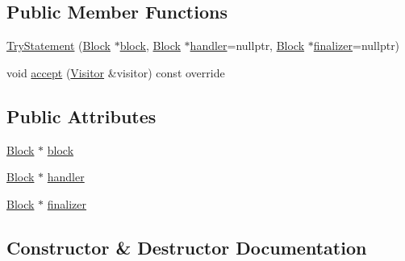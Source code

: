 \subsection*{Public Member Functions}
\begin{DoxyCompactItemize}
\item 
\hyperlink{structast_1_1_try_statement_a315c1d32293009b676f1780044118ed3}{Try\+Statement} (\hyperlink{structast_1_1_block}{Block} $\ast$\hyperlink{structast_1_1_try_statement_a9dccbeec8ca4f06ba27991614b8f64ba}{block}, \hyperlink{structast_1_1_block}{Block} $\ast$\hyperlink{structast_1_1_try_statement_ada67f3060d470890aece707687ed0690}{handler}=nullptr, \hyperlink{structast_1_1_block}{Block} $\ast$\hyperlink{structast_1_1_try_statement_acecb6d1fa205b73259356faf86aab0fc}{finalizer}=nullptr)
\item 
void \hyperlink{structast_1_1_try_statement_a849bcb895c040d4e5655935e8c843c1c}{accept} (\hyperlink{structast_1_1_visitor}{Visitor} \&visitor) const override
\end{DoxyCompactItemize}
\subsection*{Public Attributes}
\begin{DoxyCompactItemize}
\item 
\hyperlink{structast_1_1_block}{Block} $\ast$ \hyperlink{structast_1_1_try_statement_a9dccbeec8ca4f06ba27991614b8f64ba}{block}
\item 
\hyperlink{structast_1_1_block}{Block} $\ast$ \hyperlink{structast_1_1_try_statement_ada67f3060d470890aece707687ed0690}{handler}
\item 
\hyperlink{structast_1_1_block}{Block} $\ast$ \hyperlink{structast_1_1_try_statement_acecb6d1fa205b73259356faf86aab0fc}{finalizer}
\end{DoxyCompactItemize}


\subsection{Constructor \& Destructor Documentation}
\mbox{\label{structast_1_1_try_statement_a315c1d32293009b676f1780044118ed3}} 
